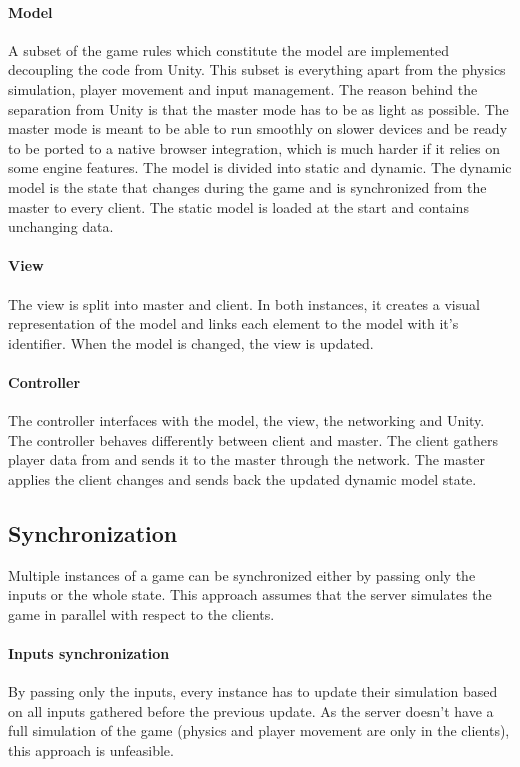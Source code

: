 \documentclass[12pt]{article}
\begin{document}
\paragraph{Model}
A subset of the game rules which constitute the model are implemented decoupling the code from Unity. This subset is everything apart from the physics simulation, player movement and input management. The reason behind the separation from Unity is that the master mode has to be as light as possible. The master mode is meant to be able to run smoothly on slower devices and be ready to be ported to a native browser integration, which is much harder if it relies on some engine features. The model is divided into static and dynamic. The dynamic model is the state that changes during the game and is synchronized from the master to every client. The static model is loaded at the start and contains unchanging data.
\paragraph{View}
The view is split into master and client. In both instances, it creates a visual representation of the model and links each element to the model with it's identifier. When the model is changed, the view is updated.
\paragraph{Controller}
The controller interfaces with the model, the view, the networking and Unity. The controller behaves differently between client and master. The client gathers player data from and sends it to the master through the network. The master applies the client changes and sends back the updated dynamic model state. 

\clearpage

\subsection{Synchronization}
Multiple instances of a game can be synchronized either by passing only the inputs or the whole state. This approach assumes that the server simulates the game in parallel with respect to the clients.

\paragraph{Inputs synchronization}
By passing only the inputs, every instance has to update their simulation based on all inputs gathered before the previous update. As the server doesn't have a full simulation of the game (physics and player movement are only in the clients), this approach is unfeasible.
\end{document}
